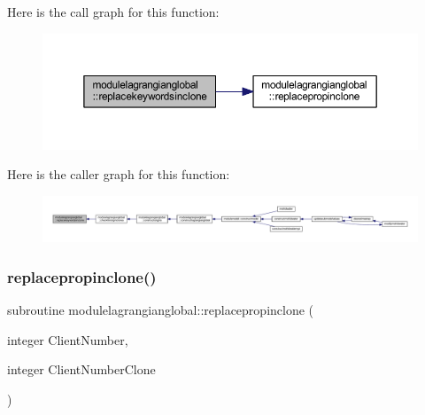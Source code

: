 Here is the call graph for this function\+:\nopagebreak
\begin{figure}[H]
\begin{center}
\leavevmode
\includegraphics[width=350pt]{namespacemodulelagrangianglobal_a9d7ee93eda9bae199e15651c725e4c7c_cgraph}
\end{center}
\end{figure}
Here is the caller graph for this function\+:\nopagebreak
\begin{figure}[H]
\begin{center}
\leavevmode
\includegraphics[width=350pt]{namespacemodulelagrangianglobal_a9d7ee93eda9bae199e15651c725e4c7c_icgraph}
\end{center}
\end{figure}
\mbox{\label{namespacemodulelagrangianglobal_a203dd84eb4a1c9f6704c8a3af740be1b}} 
\subsubsection{\texorpdfstring{replacepropinclone()}{replacepropinclone()}}
{\footnotesize\ttfamily subroutine modulelagrangianglobal\+::replacepropinclone (\begin{DoxyParamCaption}\item[{integer}]{Client\+Number,  }\item[{integer}]{Client\+Number\+Clone }\end{DoxyParamCaption})\hspace{0.3cm}{\ttfamily [private]}}

